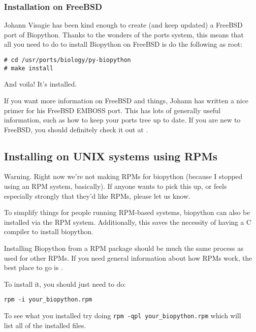 \documentclass{article}
\begin{document}
\subsubsection{Installation on FreeBSD}

Johann Visagie has been kind enough to create (and keep updated) a FreeBSD port of Biopython. Thanks to the wonders of the ports system, this means that all you need to do to install Biopython on FreeBSD is do the following as root:

\begin{verbatim}
# cd /usr/ports/biology/py-biopython
# make install
\end{verbatim}

And voila! It's installed. 


If you want more information on FreeBSD and things, Johann has written a nice primer for his FreeBSD EMBOSS port. This has lots of generally useful information, such as how to keep your ports tree up to date. If you are new to FreeBSD, you should definitely check it out at .

\subsection{Installing on UNIX systems using RPMs}

Warning. Right now we're not making RPMs for biopython (because I
stopped using an RPM system, basically). If anyone wants to pick this
up, or feels especially strongly that they'd like RPMs, please let us
know.

To simplify things for people running RPM-based systems, biopython can
also be installed via the RPM system. Additionally, this saves the 
necessity of having a C compiler to install biopython. 


Installing Biopython from a RPM package should be much the same process as used for other RPMs. If you need general information about how RPMs work, the best place to go is .


To install it, you should just need to do:

\begin{verbatim}
rpm -i your_biopython.rpm
\end{verbatim}

To see what you installed try doing \verb|rpm -qpl your_biopython.rpm| which will list all of the installed files.
\end{document}
